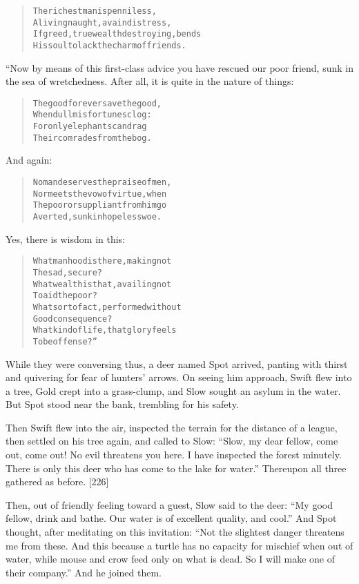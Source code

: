 \documentclass[article, twoside, 14pt]{memoir}
\renewenvironment{verbatim}{%
\begin{quote}%
\vskip -10pt%
\begin{alltt}\normalfont\large}{\end{alltt}%
\end{quote}%
\vskip -10pt
} %
\begin{document}
\begin{verbatim}
The richest man is penniless,
A living naught, a vain distress,
If greed, true wealth destroying, bends
His soul to lack the charm of friends.
\end{verbatim}
“Now by means of this first-class advice you have rescued our poor
friend, sunk in the sea of wretchedness. After all, it is quite in
the nature of things:

\begin{verbatim}
The good forever save the good,
    When dull misfortunes clog:
For only elephants can drag
    Their comrades from the bog.
\end{verbatim}
And again:

\begin{verbatim}
No man deserves the praise of men,
Nor meets the vow of virtue, when
The poor or suppliant from him go
Averted, sunk in hopeless woe.
\end{verbatim}
Yes, there is wisdom in this:

\begin{verbatim}
What manhood is there, making not
    The sad, secure?
What wealth is that, availing not
    To aid the poor?
What sort of act, performed without
    Good consequence?
What kind of life, that glory feels
    To be offense?”
\end{verbatim}
While they were conversing thus, a deer named Spot arrived, panting
with thirst and quivering for fear of hunters' arrows. On seeing
him approach, Swift flew into a tree, Gold crept into a
grass-clump, and Slow sought an asylum in the water. But Spot stood
near the bank, trembling for his safety.

Then Swift flew into the air, inspected the terrain for the
distance of a league, then settled on his tree again, and called to
Slow:
``Slow, my dear fellow, come out, come out! No evil threatens you here. I have inspected the forest minutely. There is only this deer who has come to the lake for water.''
Thereupon all three gathered as before. [226]

Then, out of friendly feeling toward a guest, Slow said to the
deer:
``My good fellow, drink and bathe. Our water is of excellent quality, and cool.''
And Spot thought, after meditating on this invitation:
``Not the slightest danger threatens me from these. And this because a turtle has no capacity for mischief when out of water, while mouse and crow feed only on what is dead. So I will make one of their company.''
And he joined them.
\end{document}
